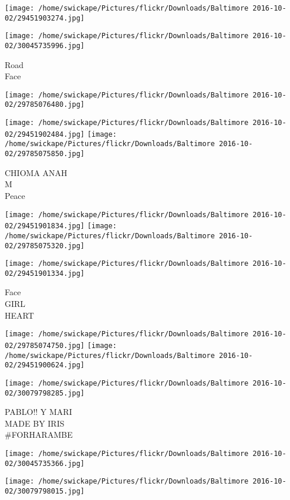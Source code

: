 \documentclass[10pt,letterpaper]{article}
\begin{document}
\texttt{[image: /home/swickape/Pictures/flickr/Downloads/Baltimore 2016-10-02/29451903274.jpg]}

\vspace{0.25in}
\texttt{[image: /home/swickape/Pictures/flickr/Downloads/Baltimore 2016-10-02/30045735996.jpg]}

Road\\
Face
\pagebreak

\texttt{[image: /home/swickape/Pictures/flickr/Downloads/Baltimore 2016-10-02/29785076480.jpg]}

\vspace{0.25in}
\texttt{[image: /home/swickape/Pictures/flickr/Downloads/Baltimore 2016-10-02/29451902484.jpg]}
\texttt{[image: /home/swickape/Pictures/flickr/Downloads/Baltimore 2016-10-02/29785075850.jpg]}

CHIOMA ANAH\\
M\\
Peace
\pagebreak

\texttt{[image: /home/swickape/Pictures/flickr/Downloads/Baltimore 2016-10-02/29451901834.jpg]}
\texttt{[image: /home/swickape/Pictures/flickr/Downloads/Baltimore 2016-10-02/29785075320.jpg]}

\vspace{0.25in}
\texttt{[image: /home/swickape/Pictures/flickr/Downloads/Baltimore 2016-10-02/29451901334.jpg]}

Face\\
GIRL\\
HEART
\pagebreak

\texttt{[image: /home/swickape/Pictures/flickr/Downloads/Baltimore 2016-10-02/29785074750.jpg]}
\texttt{[image: /home/swickape/Pictures/flickr/Downloads/Baltimore 2016-10-02/29451900624.jpg]}

\vspace{0.25in}
\texttt{[image: /home/swickape/Pictures/flickr/Downloads/Baltimore 2016-10-02/30079798285.jpg]}

PABLO!! Y MARI\\
MADE BY IRIS\\
\#FORHARAMBE
\pagebreak

\texttt{[image: /home/swickape/Pictures/flickr/Downloads/Baltimore 2016-10-02/30045735366.jpg]}

\vspace{0.25in}
\texttt{[image: /home/swickape/Pictures/flickr/Downloads/Baltimore 2016-10-02/30079798015.jpg]}
\end{document}
